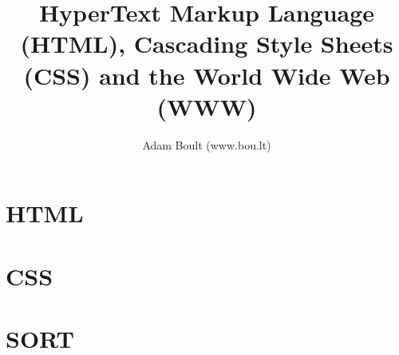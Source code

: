 \documentclass[oneside]{book}
\begin{document}
\author{Adam Boult (www.bou.lt)}
\title{HyperText Markup Language (HTML), Cascading Style Sheets (CSS) and the World Wide Web (WWW)}
\maketitle

\setcounter{tocdepth}{0}
\tableofcontents



\part{HTML}


\part{CSS}


\part{SORT}

\end{document}
